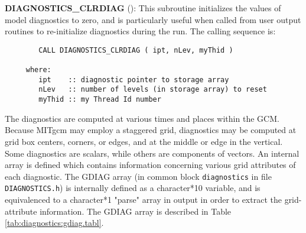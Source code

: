 \noindent
{\bf DIAGNOSTICS\_CLRDIAG} 
():
This subroutine initializes the values of model
diagnostics to zero, and is particularly useful when called from user
output routines to re-initialize diagnostics during the run.  
The calling sequence is:

\begin{verbatim}
        CALL DIAGNOSTICS_CLRDIAG ( ipt, nLev, myThid )

     where:
        ipt    :: diagnostic pointer to storage array
        nLev   :: number of levels (in storage array) to reset
        myThid :: my Thread Id number
\end{verbatim}

\noindent
The diagnostics are computed at various times and places within the
GCM. Because MITgcm may employ a staggered grid, diagnostics may be
computed at grid box centers, corners, or edges, and at the middle or
edge in the vertical. Some diagnostics are scalars, while others are
components of vectors. An internal array is defined which contains
information concerning various grid attributes of each diagnostic. The
GDIAG array (in common block {\tt diagnostics} in file {\tt
  DIAGNOSTICS.h}) is internally defined as a character*10 variable, and
is equivalenced to a character*1 "parse" array in output in order to
extract the grid-attribute information.  The GDIAG array is described
in Table \ref{tab:diagnostics:gdiag.tabl}.

